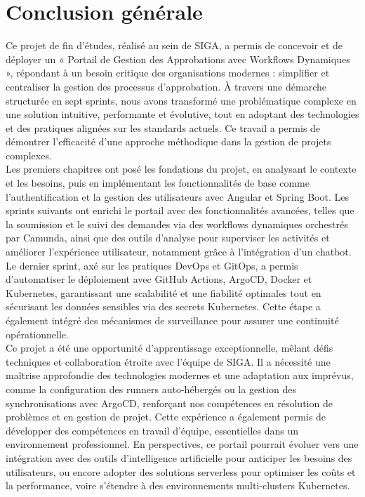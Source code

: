 \chapter*{Conclusion générale}

Ce projet de fin d’études, réalisé au sein de SIGA, a permis de concevoir et de déployer un « Portail de Gestion des Approbations avec Workflows Dynamiques », répondant à un besoin critique des organisations modernes : simplifier et centraliser la gestion des processus d’approbation. À travers une démarche structurée en sept sprints, nous avons transformé une problématique complexe en une solution intuitive, performante et évolutive, tout en adoptant des technologies et des pratiques alignées sur les standards actuels. Ce travail a permis de démontrer l’efficacité d’une approche méthodique dans la gestion de projets complexes. \\

Les premiers chapitres ont posé les fondations du projet, en analysant le contexte et les besoins, puis en implémentant les fonctionnalités de base comme l’authentification et la gestion des utilisateurs avec Angular et Spring Boot. Les sprints suivants ont enrichi le portail avec des fonctionnalités avancées, telles que la soumission et le suivi des demandes via des workflows dynamiques orchestrés par Camunda, ainsi que des outils d’analyse pour superviser les activités et améliorer l’expérience utilisateur, notamment grâce à l’intégration d’un chatbot. Le dernier sprint, axé sur les pratiques DevOps et GitOps, a permis d’automatiser le déploiement avec GitHub Actions, ArgoCD, Docker et Kubernetes, garantissant une scalabilité et une fiabilité optimales tout en sécurisant les données sensibles via des secrets Kubernetes. Cette étape a également intégré des mécanismes de surveillance pour assurer une continuité opérationnelle. \\

Ce projet a été une opportunité d’apprentissage exceptionnelle, mêlant défis techniques et collaboration étroite avec l’équipe de SIGA. Il a nécessité une maîtrise approfondie des technologies modernes et une adaptation aux imprévus, comme la configuration des runners auto-hébergés ou la gestion des synchronisations avec ArgoCD, renforçant nos compétences en résolution de problèmes et en gestion de projet. Cette expérience a également permis de développer des compétences en travail d’équipe, essentielles dans un environnement professionnel. En perspectives, ce portail pourrait évoluer vers une intégration avec des outils d’intelligence artificielle pour anticiper les besoins des utilisateurs, ou encore adopter des solutions serverless pour optimiser les coûts et la performance, voire s’étendre à des environnements multi-clusters Kubernetes. \\

